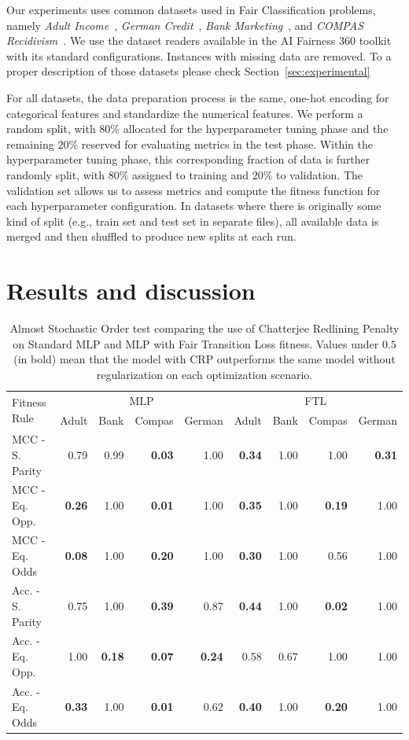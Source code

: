 Our experiments uses common datasets used in Fair Classification problems, namely \textit{Adult Income}~\citep{misc_adult_2}, \textit{German Credit}~\citep{misc_statlog_(german_credit_data)_144}, \textit{Bank Marketing}~\citep{misc_bank_marketing_222}, and \textit{COMPAS Recidivism}~\citep{misc_compas}. We use the dataset readers available in the AI Fairness 360 toolkit~\citep{aif360-oct-2018} with its standard configurations. Instances with missing data are removed. To a proper description of those datasets please check Section~\ref{sec:experimental}


For all datasets, the data preparation process is the same, one-hot encoding for categorical features and standardize the numerical features. We perform a random split, with $80\%$ allocated for the hyperparameter tuning phase and the remaining $20\%$ reserved for evaluating metrics in the test phase. Within the hyperparameter tuning phase, this corresponding fraction of data is further randomly split, with $80\%$ assigned to training and $20\%$ to validation. The validation set allows us to assess metrics and compute the fitness function for each hyperparameter configuration. In datasets where there is originally some kind of split (e.g., train set and test set in separate files), all available data is merged and then shuffled to produce new splits at each run.

\section{Results and discussion}


\begin{table}[ht]
\centering
\caption{Almost Stochastic Order test comparing the use of Chatterjee Redlining Penalty on Standard MLP and MLP with Fair Transition Loss fitness. Values under $0.5$ (in bold) mean that the model with CRP outperforms the same model without regularization on each optimization scenario.} \label{tab:aso_compare_crp}
{\footnotesize
\begin{tabular}{lrrrr|rrrr}
\toprule
\multirow{2}{*}{Fitness Rule} & \multicolumn{4}{c}{MLP} & \multicolumn{4}{c}{FTL} \\
& Adult & Bank & Compas & German & Adult & Bank & Compas & German \\
\midrule
MCC - S. Parity & 0.79 & 0.99 & \textbf{0.03} & 1.00 & \textbf{0.34} & 1.00 & 1.00 & \textbf{0.31} \\
MCC - Eq. Opp. & \textbf{0.26} & 1.00 & \textbf{0.01} & 1.00 & \textbf{0.35} & 1.00 & \textbf{0.19} & 1.00 \\
MCC - Eq. Odds & \textbf{0.08} & 1.00 & \textbf{0.20} & 1.00 & \textbf{0.30} & 1.00 & 0.56 & 1.00 \\
Acc. - S. Parity & 0.75 & 1.00 & \textbf{0.39} & 0.87 & \textbf{0.44} & 1.00 & \textbf{0.02} & 1.00 \\
Acc. - Eq. Opp. & 1.00 & \textbf{0.18} & \textbf{0.07} & \textbf{0.24} & 0.58 & 0.67 & 1.00 & 1.00 \\
Acc. - Eq. Odds & \textbf{0.33} & 1.00 & \textbf{0.01} & 0.62 & \textbf{0.40} & 1.00 & \textbf{0.20} & 1.00 \\
\bottomrule
\end{tabular}
}
\end{table}


